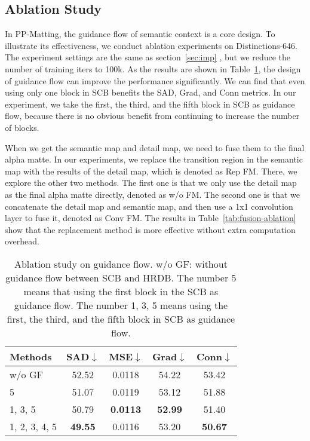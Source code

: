 \documentclass[10pt,twocolumn,letterpaper]{article}
\begin{document}
\subsection{Ablation Study}
In PP-Matting, the guidance flow of semantic context is a core design. To illustrate its effectiveness, we conduct ablation experiments on Distinctions-646. The experiment settings are the same as section~\ref{sec:imp} , but we reduce the number of training iters to 100k. As the results are shown in Table~\ref{tab:flow ablation}, the design of guidance flow can improve the performance significantly. We can find that even using only one block in SCB benefits the SAD, Grad, and Conn metrics. In our experiment, we take the first, the third, and the fifth block in SCB as guidance flow, because there is no obvious benefit from continuing to increase the number of blocks.

When we get the semantic map and detail map, we need to fuse them to the final alpha matte. In our experiments, we replace the transition region in the semantic map with the results of the detail map, which is denoted as Rep FM. There, we explore the other two methods. The first one is that we only use the detail map as the final alpha matte directly, denoted as w/o FM. The second one is that we concatenate the detail map and semantic map, and then use a 1x1 convolution layer to fuse it, denoted as Conv FM. The results in Table~\ref{tab:fusion-ablation} show that the replacement method is more effective without extra computation overhead.

\begin{table}
  \centering
  \begin{tabular}{@{}lcccc@{}}
    \toprule
    Methods & SAD$\downarrow$ & MSE$\downarrow$ & Grad$\downarrow$ & Conn$\downarrow$ \\
    \midrule
    w/o GF & 52.52 & 0.0118 & 54.22 & 53.42 \\
    5 & 51.07 & 0.0119 & 53.12 & 51.88  \\
    1, 3, 5 &50.79 & \bf{0.0113} & \bf{52.99} & 51.40 \\
    1, 2, 3, 4, 5 & \bf{49.55} & 0.0116 & 53.20 & \bf{50.67} \\
    \bottomrule
  \end{tabular}
  \caption{Ablation study on guidance flow. w/o GF: without guidance flow between SCB and HRDB. The number 5 means that using the first block in the SCB as guidance flow. The number 1, 3, 5 means using the first, the third, and the fifth block in SCB as guidance flow.}
  \label{tab:flow ablation}
\end{table}
\end{document}
